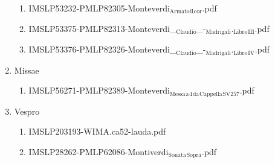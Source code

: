 \documentclass[11pt]{article}
\begin{document}
\begin{enumerate}
\begin{enumerate}
\item IMSLP53232-PMLP82305-Monteverdi$_{\text{Armato}}$$_{\text{il}}$$_{\text{cor}}$.pdf
\label{sec-1-1-1-1-44-48-9-5}

\item IMSLP53375-PMLP82313-Monteverdi\_$_{\text{Claudio}}$\_-$_{\text{Madrigali}}$.$_{\text{Libro}}$$_{\text{III}}$.pdf
\label{sec-1-1-1-1-44-48-9-6}

\item IMSLP53376-PMLP82326-Monteverdi\_$_{\text{Claudio}}$\_-$_{\text{Madrigali}}$.$_{\text{Libro}}$$_{\text{IV}}$.pdf
\label{sec-1-1-1-1-44-48-9-7}
\end{enumerate}

\item Missae
\label{sec-1-1-1-1-44-48-10}
\begin{enumerate}
\item IMSLP56271-PMLP82389-Monteverdi$_{\text{Messa}}$$_{\text{a}}$$_{\text{4}}$$_{\text{da}}$$_{\text{Cappella}}$$_{\text{SV257}}$.pdf
\label{sec-1-1-1-1-44-48-10-1}
\end{enumerate}

\item Vespro
\label{sec-1-1-1-1-44-48-11}
\begin{enumerate}
\item IMSLP203193-WIMA.ca52-lauda.pdf
\label{sec-1-1-1-1-44-48-11-1}

\item IMSLP28262-PMLP62086-Montiverdi$_{\text{Sonata}}$$_{\text{Sopra}}$.pdf
\label{sec-1-1-1-1-44-48-11-2}
\end{enumerate}
\end{enumerate}
\end{document}
